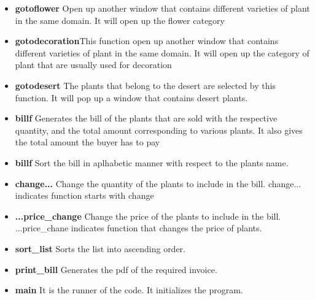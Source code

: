 \documentclass[11pt,a4paper]{article}
\begin{document}
\begin{flushleft}
\begin{itemize}
	\item \textbf{gotoflower} Open up another window that contains different varieties of plant in the same domain. It will open up the flower category\\
	
	\item \textbf{gotodecoration}This function open up another window that contains different varieties of plant in the same domain. It will open up the category of plant that are usually used for decoration\\
	
	\item \textbf{gotodesert} The plants that belong to the desert are selected by this function. It will pop up a window that contains desert plants.\\
	
	\item \textbf{billf} Generates the bill of the plants that are sold with the respective quantity, and the total amount corresponding to various plants.
	It also gives the total amount the buyer has to pay\\
	
	\item \textbf{billf} Sort the bill in aplhabetic manner with respect to the plants name.\\
	
	\item \textbf{change...} Change the quantity of the plants to include in the bill. change... indicates function starts with change \\
	
	\item \textbf{...price\_change} Change the price of the plants to include in the bill. ...price\_chane indicates function that changes the price of plants. \\
	
	\item \textbf{sort\_list} Sorts the list into ascending order. \\
	
	\item \textbf{print\_bill} Generates the pdf of the required invoice. \\
	
	
	\item \textbf{main} It is the runner of the code. It initializes the program.\\
	\end{itemize}
	
\end{flushleft}
\pagebreak
\end{document}
